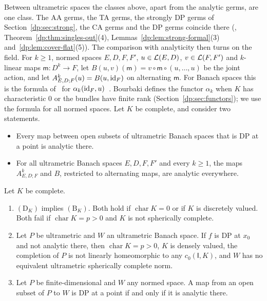 Between ultrametric spaces the classes above, apart from the analytic germs, are one class. The AA germs, the TA germs, the strongly DP germs of Section~\ref{dp:sec:strong}, the CA germs and the DP germs coincide there (\cite[Theorem~14.39(1)]{I}, Theorem~\ref{dp:thm:singles-out}(4), Lemmas~\ref{dp:lem:strong-formal}(3) and~\ref{dp:lem:cover-flat}(5)). The comparison with analyticity then turns on the field. For $k\ge1$, normed spaces $E,D,F,F'$, $u\in\mathcal L(E,D)$, $v\in\mathcal L(F,F')$ and $k$-linear maps $\mathsf m\colon D^k\to F$, let $B(u,v)(\mathsf m)=v\circ\mathsf m\circ(u,\dots,u)$ be the joint action, and let $A^k_{E,D;F}(u)=B(u,\mathrm{id}_F)$ on alternating $\mathsf m$. For Banach spaces this is the formula of~\cite[n\textsuperscript{o}~7.8.1]{Bou} for $\alpha_k(\mathrm{id}_F,u)$~\cite[Section~10.2]{I}. Bourbaki defines the functor $\alpha_k$ when $K$ has characteristic $0$ or the bundles have finite rank (Section~\ref{dp:sec:functors}); we use the formula for all normed spaces. Let $K$ be complete, and consider two statements.
\begin{itemize}
\item[$(\mathrm D_K)$] Every map between open subsets of ultrametric Banach spaces that is DP at a point is analytic there.
\item[$(\mathrm B_K)$] For all ultrametric Banach spaces $E,D,F,F'$ and every $k\ge1$, the maps $A^k_{E,D;F}$ and $B$, restricted to alternating maps, are analytic everywhere.
\end{itemize}

\begin{introtheorem}\label{dp:intro:D}
Let $K$ be complete.
\begin{enumerate}
\item $(\mathrm D_K)$ implies $(\mathrm B_K)$. Both hold if $\operatorname{char}K=0$ or if $K$ is discretely valued. Both fail if $\operatorname{char}K=p>0$ and $K$ is not spherically complete.
\item Let $P$ be ultrametric and $W$ an ultrametric Banach space. If $f$ is DP at $x_0$ and not analytic there, then $\operatorname{char}K=p>0$, $K$ is densely valued, the completion of $P$ is not linearly homeomorphic to any $c_0(\mathsf I,K)$, and $W$ has no equivalent ultrametric spherically complete norm.
\item Let $P$ be finite-dimensional and $W$ any normed space. A map from an open subset of $P$ to $W$ is DP at a point if and only if it is analytic there.
\end{enumerate}
\end{introtheorem}

